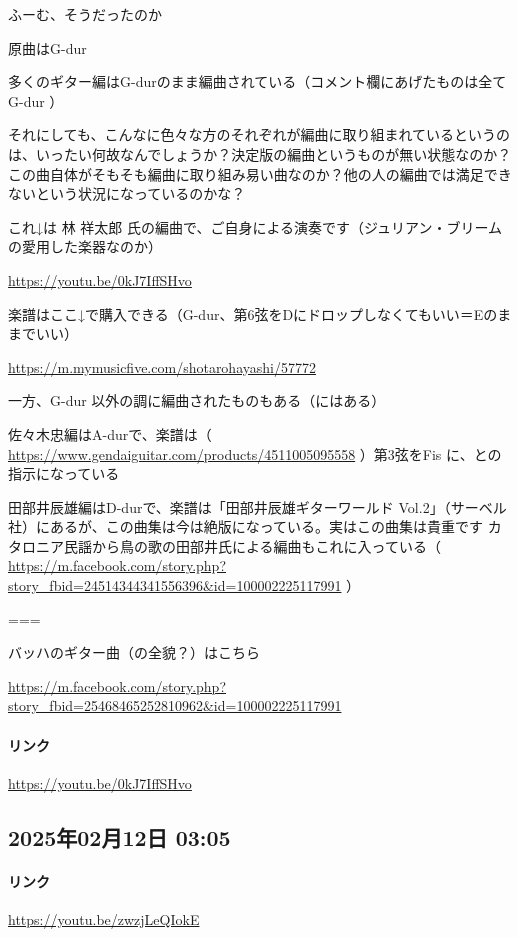 ふーむ、そうだったのか

原曲はG-dur

多くのギター編はG-durのまま編曲されている（コメント欄にあげたものは全てG-dur ）

それにしても、こんなに色々な方のそれぞれが編曲に取り組まれているというのは、いったい何故なんでしょうか？決定版の編曲というものが無い状態なのか？この曲自体がそもそも編曲に取り組み易い曲なのか？他の人の編曲では満足できないという状況になっているのかな？

これ↓は 林 祥太郎 氏の編曲で、ご自身による演奏です（ジュリアン・ブリームの愛用した楽器なのか）

\url{https://youtu.be/0kJ7IffSHvo}

楽譜はここ↓で購入できる（G-dur、第6弦をDにドロップしなくてもいい＝Eのままでいい）

\url{https://m.mymusicfive.com/shotarohayashi/57772}

一方、G-dur 以外の調に編曲されたものもある（にはある）

佐々木忠編はA-durで、楽譜は（ \url{https://www.gendaiguitar.com/products/4511005095558} ）第3弦をFis に、との指示になっている

田部井辰雄編はD-durで、楽譜は「田部井辰雄ギターワールド Vol.2」（サーベル社）にあるが、この曲集は今は絶版になっている。実はこの曲集は貴重です カタロニア民謡から鳥の歌の田部井氏による編曲もこれに入っている（ \url{https://m.facebook.com/story.php?story_fbid=24514344341556396&id=100002225117991} ）

===

バッハのギター曲（の全貌？）はこちら

\url{https://m.facebook.com/story.php?story_fbid=25468465252810962&id=100002225117991}

\paragraph{リンク}
\url{https://youtu.be/0kJ7IffSHvo}

\subsection*{2025年02月12日 03:05}

\paragraph{リンク}
\url{https://youtu.be/zwzjLeQIokE}

